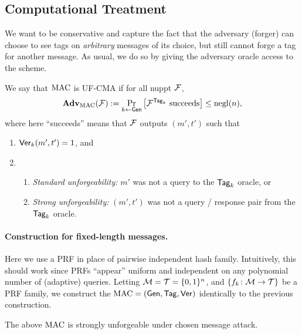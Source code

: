 \documentclass[11pt]{article}
\begin{document}
\subsection{Computational Treatment}
\label{sec:comp-mac}

We want to be conservative and capture the fact that the adversary
(forger) can choose to see tags on \emph{arbitrary} messages of its
choice, but still cannot forge a tag for another message.  As usual,
we do so by giving the adversary oracle access to the scheme.

\begin{definition}
  \label{def:uf-mca}
  We say that $\text{MAC}$ is UF-CMA if for all nuppt $\mathcal{F}$,
  \[
  \mathbf{Adv}_{\text{MAC}}(\mathcal{F}) := \Pr_{k \gets \mathsf{Gen}}\left[\mathcal{F}^{\mathsf{Tag}_k}
  \text{ succeeds} \right] \leq \operatorname{negl}(n),
  \]
  where here ``succeeds'' means that $\mathcal{F}$ outputs $(m',t')$ such that
  \begin{enumerate}
  \item $\mathsf{Ver}_k(m',t') = 1$, and
  \item 
    \begin{enumerate}
    \item \emph{Standard unforgeability:} $m'$ was not a query to the
      $\mathsf{Tag}_{k}$ oracle, or
    \item \emph{Strong unforgeability:} $(m',t')$ was not a query /
      response pair from the $\mathsf{Tag}_{k}$ oracle.
    \end{enumerate}
  \end{enumerate}
\end{definition}

\paragraph{Construction for fixed-length messages.}

Here we use a PRF in place of pairwise independent hash family.
Intuitively, this should work since PRFs ``appear'' uniform and
independent on any polynomial number of (adaptive) queries.  Letting
$\mathcal{M} = \mathcal{T} = \{0,1\}^n$, and $\{f_k \colon \mathcal{M} \to
  \mathcal{T}\}$ be a PRF family, we construct the $\text{MAC} = (\mathsf{Gen},
\mathsf{Tag}, \mathsf{Ver})$ identically to the previous construction.

\begin{theorem} 
  The above $\text{MAC}$ is strongly unforgeable under chosen message
  attack.
\end{theorem}
\end{document}
